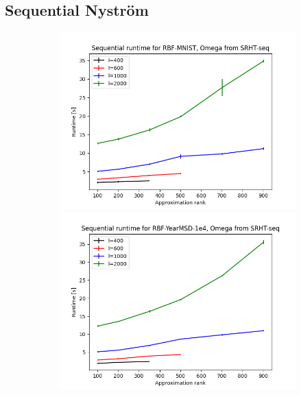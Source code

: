 \documentclass{article}
\theoremstyle{definition}
\begin{document}
\clearpage{}
\printbibliography{} %
\clearpage
\begin{appendices}
\section{Sequential Nyström}
\begin{figure}
\centering
\hfill\begin{subfigure}[t]{\textwidth+20pt\relax}
    \includegraphics[width=\dimexpr\linewidth-20pt\relax]{plots/runtime/runtime_RBF-MNIST_SRHT-seq.png}
    \includegraphics[width=\dimexpr\linewidth-20pt\relax]{plots/runtime/runtime_RBF-YearMSD-1e4_SRHT-seq.png}

\end{subfigure}
\end{figure}
\end{appendices}
\end{document}
